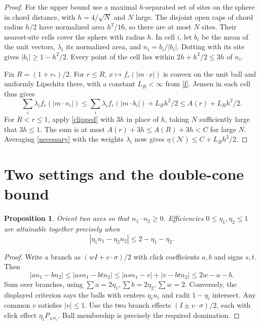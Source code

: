 \documentclass[11pt,a4paper]{article}
\newtheorem{proposition}[theorem]{Proposition}
\theoremstyle{remark}
\begin{document}
\begin{proof}
For the upper bound use a maximal \(h\)-separated set of sites on the sphere in chord distance, with \(h=4/\sqrt N\) and \(N\) large. The disjoint open caps of chord radius \(h/2\) have normalized area \(h^2/16\), so there are at most \(N\) sites. Their nearest-site cells cover the sphere with radius \(h\). In cell \(i\), let \(b_i\) be the mean of the unit vectors, \(\lambda_i\) its normalized area, and \(n_i=b_i/|b_i|\). Dotting with its site gives \(|b_i|\ge1-h^2/2\). Every point of the cell lies within \(2h+h^2/2\le3h\) of \(n_i\).

Fix \(R=(1+r_*)/2\). For \(r\le R\), \(x\mapsto f_r(|m\cdot x|)\) is convex on the unit ball and uniformly Lipschitz there, with a constant \(L_R<\infty\) from \eqref{f}. Jensen in each cell thus gives
\[
 \sum_i\lambda_i f_r(|m\cdot n_i|)
 \le \sum_i\lambda_i f_r(|m\cdot b_i|)+L_Rh^2/2
 \le A(r)+L_Rh^2/2 .
\]
For \(R<r\le1\), apply \eqref{clipped} with \(3h\) in place of \(h\), taking \(N\) sufficiently large that \(3h\le1\). The sum is at most \(A(r)+3h\le A(R)+3h<C\) for large \(N\). Averaging \eqref{necessary} with the weights \(\lambda_i\) now gives \(\eta(\mathcal N)\le C+L_Rh^2/2\).
\end{proof}

\newpage
\section{Two settings and the double-cone bound}

\begin{proposition}\label{two}
Orient two axes so that \(n_1\cdot n_2\ge0\). Efficiencies \(0\le\eta_1,\eta_2\le1\) are attainable together precisely when
\[
                  |\eta_1 n_1-\eta_2 n_2|\le 2-\eta_1-\eta_2 .
\]
\end{proposition}
\begin{proof}
Write a branch as \((wI+v\cdot\sigma)/2\) with click coefficients \(a,b\) and signs \(s,t\). Then
\[
 |a n_1-b n_2|\le |as n_1-bt n_2|
 \le |as n_1-v|+|v-bt n_2|\le2w-a-b .
\]
Sum over branches, using \(\sum a=2\eta_1,\sum b=2\eta_2,\sum w=2\). Conversely, the displayed criterion says the balls with centers \(\eta_i n_i\) and radii \(1-\eta_i\) intersect. Any common \(v\) satisfies \(|v|\le1\). Use the two branch effects \((I\pm v\cdot\sigma)/2\), each with click effect \(\eta_i P_{\pm n_i}\). Ball membership is precisely the required domination.
\end{proof}
\end{document}
